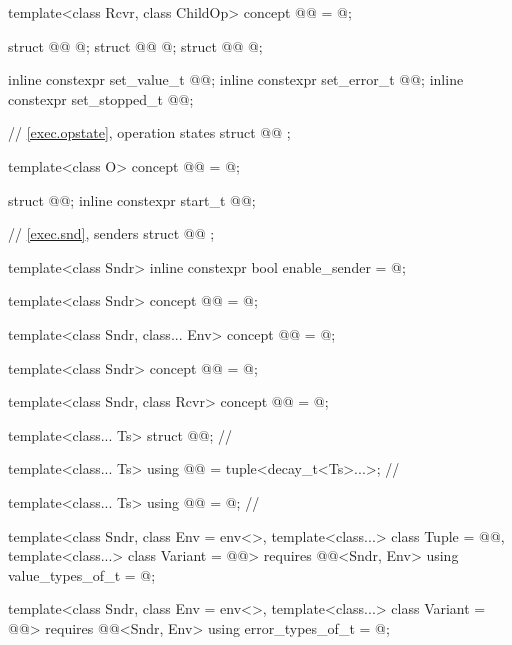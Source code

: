 \begin{codeblock}
{  template<class Rcvr, class ChildOp>
    concept @@ = @\seebelow@;

  struct @@ { @\unspec@ };
  struct @@ { @\unspec@ };
  struct @@ { @\unspec@ };

  inline constexpr set_value_t @@{};
  inline constexpr set_error_t @@{};
  inline constexpr set_stopped_t @@{};

  // \ref{exec.opstate}, operation states
  struct @@ {};

  template<class O>
    concept @@ = @\seebelow@;

  struct @@;
  inline constexpr start_t @@{};

  // \ref{exec.snd}, senders
  struct @@ {};

  template<class Sndr>
    inline constexpr bool enable_sender = @\seebelow@;

  template<class Sndr>
    concept @@ = @\seebelow@;

  template<class Sndr, class... Env>
    concept @@ = @\seebelow@;

  template<class Sndr>
    concept @@ = @\seebelow@;

  template<class Sndr, class Rcvr>
    concept @@ = @\seebelow@;

  template<class... Ts>
    struct @@;                                           // \expos

  template<class... Ts>
    using @@ = tuple<decay_t<Ts>...>;                // \expos

  template<class... Ts>
    using @@ = @\seebelownc@;                         // \expos

  template<class Sndr, class Env = env<>,
           template<class...> class Tuple = @@,
           template<class...> class Variant = @@>
      requires @@<Sndr, Env>
    using value_types_of_t = @\seebelow@;

  template<class Sndr, class Env = env<>,
           template<class...> class Variant = @@>
      requires @@<Sndr, Env>
    using error_types_of_t = @\seebelow@;

}
\end{codeblock}

